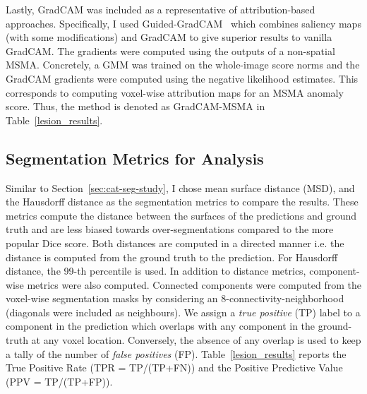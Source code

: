 Lastly, GradCAM was included as a representative of attribution-based approaches. Specifically, I used Guided-GradCAM~\cite{Selvaraju2016GradCAMVE} which combines saliency maps (with some modifications) and GradCAM to give superior results to vanilla GradCAM. The gradients were computed using the outputs of a non-spatial MSMA. Concretely, a GMM was trained on the whole-image score norms and the GradCAM gradients were computed using the negative likelihood estimates. This corresponds to computing voxel-wise attribution maps for an MSMA anomaly score. Thus, the method is denoted as GradCAM-MSMA in Table~\ref{lesion_results}.

\subsection*{Segmentation Metrics for Analysis}
Similar to Section~\ref{sec:cat-seg-study}, I chose mean surface distance (MSD), and the Hausdorff distance as the segmentation metrics to compare the results. These metrics compute the distance between the surfaces of the predictions and ground truth and are less biased towards over-segmentations compared to the more popular Dice score. Both distances are computed in a directed manner i.e. the distance is computed from the ground truth to the prediction. For Hausdorff distance, the 99-th percentile is used. In addition to distance metrics, component-wise metrics were also computed. Connected components were computed from the voxel-wise segmentation masks by considering an 8-connectivity-neighborhood (diagonals were included as neighbours). We assign a \textit{true positive} (TP) label to a component in the prediction which overlaps with any component in the ground-truth at any voxel location. Conversely, the absence of any overlap is used to keep a tally of the number of \textit{false positives} (FP). Table~\ref{lesion_results} reports the True Positive Rate (TPR = TP/(TP+FN)) and the Positive Predictive Value (PPV = TP/(TP+FP)). 


